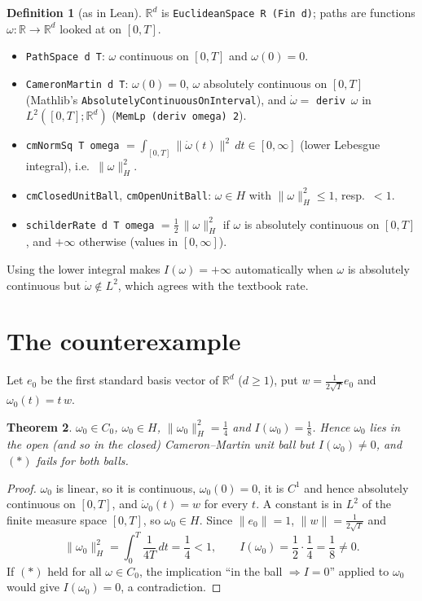 \documentclass[11pt]{article}
\newtheorem{theorem}{Theorem}
\theoremstyle{definition}
\newtheorem{definition}[theorem]{Definition}
\begin{document}
\begin{definition}[as in Lean]
$\mathbb R^d$ is \texttt{EuclideanSpace R (Fin d)}; paths are functions $\omega:\mathbb R\to\mathbb R^d$
looked at on $[0,T]$.
\begin{itemize}
\item \texttt{PathSpace d T}: $\omega$ continuous on $[0,T]$ and $\omega(0)=0$.
\item \texttt{CameronMartin d T}: $\omega(0)=0$, $\omega$ absolutely continuous on $[0,T]$
  (Mathlib's \texttt{AbsolutelyContinuousOnInterval}), and $\dot\omega=$ \texttt{deriv}~$\omega$ in
  $L^2([0,T];\mathbb R^d)$ (\texttt{MemLp (deriv omega) 2}).
\item \texttt{cmNormSq T omega} $=\int_{[0,T]}\|\dot\omega(t)\|^2\,dt\in[0,\infty]$ (lower Lebesgue
  integral), i.e.\ $\|\omega\|_H^2$.
\item \texttt{cmClosedUnitBall}, \texttt{cmOpenUnitBall}: $\omega\in H$ with
  $\|\omega\|_H^2\le 1$, resp.\ $<1$.
\item \texttt{schilderRate d T omega} $=\frac12\,\|\omega\|_H^2$ if $\omega$ is absolutely continuous on
  $[0,T]$, and $+\infty$ otherwise (values in $[0,\infty]$).
\end{itemize}
\end{definition}
Using the lower integral makes $I(\omega)=+\infty$ automatically when $\omega$ is absolutely
continuous but $\dot\omega\notin L^2$, which agrees with the textbook rate.

\section{The counterexample}
Let $e_0$ be the first standard basis vector of $\mathbb R^d$ ($d\ge1$), put
$w=\frac{1}{2\sqrt T}e_0$ and $\omega_0(t)=t\,w$.

\begin{theorem}
$\omega_0\in C_0$, $\omega_0\in H$, $\|\omega_0\|_H^2=\frac14$ and $I(\omega_0)=\frac18$.
Hence $\omega_0$ lies in the open (and so in the closed) Cameron--Martin unit ball but
$I(\omega_0)\ne0$, and $(\ast)$ fails for both balls.
\end{theorem}
\begin{proof}
$\omega_0$ is linear, so it is continuous, $\omega_0(0)=0$, it is $C^1$ and hence absolutely
continuous on $[0,T]$, and $\dot\omega_0(t)=w$ for every $t$. A constant is in $L^2$ of the finite
measure space $[0,T]$, so $\omega_0\in H$. Since $\|e_0\|=1$, $\|w\|=\frac{1}{2\sqrt T}$ and
\[\|\omega_0\|_H^2=\int_0^T\frac{1}{4T}\,dt=\frac14<1,\qquad I(\omega_0)=\frac12\cdot\frac14=\frac18\neq0.\]
If $(\ast)$ held for all $\omega\in C_0$, the implication ``in the ball $\Rightarrow I=0$'' applied
to $\omega_0$ would give $I(\omega_0)=0$, a contradiction.
\end{proof}
\end{document}
